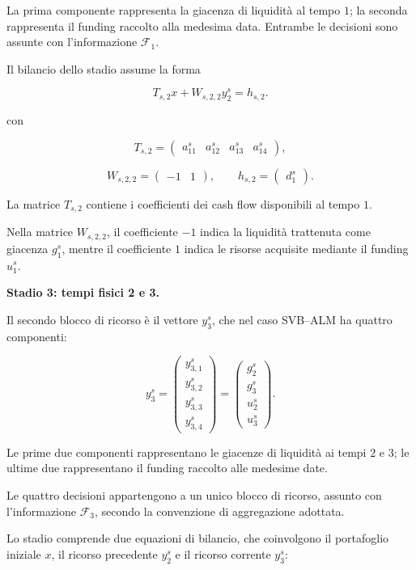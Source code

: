 La prima componente rappresenta la giacenza
di liquidit\`a al tempo $1$; la seconda
rappresenta il funding raccolto alla medesima
data. Entrambe le decisioni sono assunte
con l'informazione $\mathcal F_1$.

Il bilancio dello stadio assume la forma

\[
T_{s,2}x+W_{s,2,2}y_2^s=h_{s,2}.
\]

con

\[
T_{s,2}
=
\begin{pmatrix}
a_{11}^s&a_{12}^s&a_{13}^s&a_{14}^s
\end{pmatrix},
\]

\[
W_{s,2,2}
=
\begin{pmatrix}
-1&1
\end{pmatrix},
\qquad
h_{s,2}=
\begin{pmatrix}
d_1^s
\end{pmatrix}.
\]

La matrice $T_{s,2}$ contiene
i coefficienti dei cash flow disponibili
al tempo $1$.

Nella matrice $W_{s,2,2}$,
il coefficiente $-1$ indica
la liquidit\`a trattenuta come giacenza
$g_1^s$, mentre il coefficiente $1$
indica le risorse acquisite mediante
il funding $u_1^s$.

\medskip

\noindent
\textbf{Stadio 3: tempi fisici 2 e 3.}

Il secondo blocco di ricorso \`e il vettore
$y_3^s$, che nel caso SVB--ALM ha quattro componenti:

\[
y_3^s
=
\begin{pmatrix}
y_{3,1}^s\\
y_{3,2}^s\\
y_{3,3}^s\\
y_{3,4}^s
\end{pmatrix}
=
\begin{pmatrix}
g_2^s\\
g_3^s\\
u_2^s\\
u_3^s
\end{pmatrix}.
\]

Le prime due componenti rappresentano
le giacenze di liquidit\`a ai tempi $2$ e $3$;
le ultime due rappresentano il funding
raccolto alle medesime date.

Le quattro decisioni appartengono a un unico
blocco di ricorso, assunto con l'informazione
$\mathcal F_3$, secondo la convenzione
di aggregazione adottata.

Lo stadio comprende due equazioni di bilancio,
che coinvolgono il portafoglio iniziale $x$,
il ricorso precedente $y_2^s$
e il ricorso corrente $y_3^s$:

